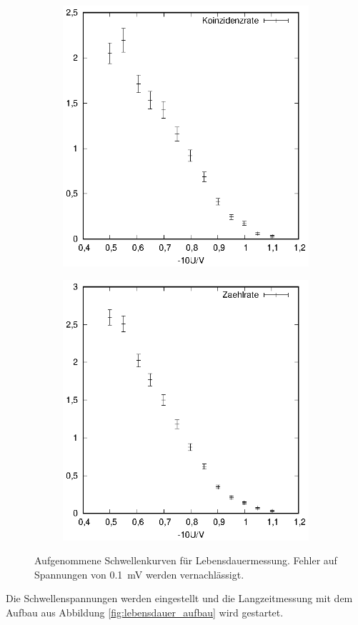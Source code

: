 \begin{figure}[h]
\begin{subfigure}[h]{0.5\textwidth}
  \end{subfigure}
  \begin{subfigure}[h]{0.5\textwidth}
    \centering
    \includegraphics[width=\textwidth]{data/schwelle_2_koinzidenz.eps}
  \end{subfigure}%
  \begin{subfigure}[h]{0.5\textwidth}
    \centering
    \includegraphics[width=\textwidth]{data/schwelle_2_zaehler.eps}
  \end{subfigure}
  \caption{Aufgenommene Schwellenkurven für Lebensdauermessung. Fehler auf Spannungen von \SI{0.1}{\milli\volt} werden vernachlässigt.}
  \label{fig:schwelle_lebensdauer}
\end{figure} 
Die Schwellenspannungen werden eingestellt und die Langzeitmessung mit dem Aufbau aus Abbildung \ref{fig:lebensdauer_aufbau} wird gestartet.
